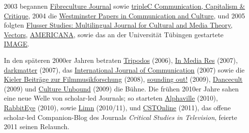 \documentclass[a4paper,
fontsize=11pt,
oneside,
numbers=noperiodatend,
parskip=half-,
bibliography=totoc,
final
]{scrartcl}
\begin{document}
2003 begannen \href{https://fibreculturejournal.org/}{Fibreculture
Journal} sowie
\href{https://www.triple-c.at/index.php/tripleC/about}{tripleC
Communication, Capitalism \& Critique}, 2004 die
\href{https://www.westminsterpapers.org/}{Westminster Papers in
Communication and Culture}, und 2005 folgten
\href{https://www.flusserstudies.net/archive}{Flusser Studies:
Multilingual Journal for Cultural and Media Theory},
\href{http://vectors.usc.edu/archive/}{Vectors},
\href{https://americanaejournal.hu/about}{AMERICANA}, sowie das an der
Universität Tübingen gestartete
\href{http://www.gib.uni-tuebingen.de/image}{IMAGE}.

In den späteren 2000er Jahren betraten
\href{http://www.tripodos.com/index.php/Facultat_Comunicacio_Blanquerna/about}{Tripodos}
(2006),
\href{https://mediacommons.org/imr/archives?sort_bef_combine_date=created+ASC}{In
Media Res} (2007),
\href{https://web.archive.org/web/20210122132539/http:/www.darkmatter101.org/site/about/}{darkmatter} (2007), das \href{https://ijoc.org/index.php/ijoc/about}{International
Journal of Communication} (2007) sowie die
\href{https://journals.qucosa.de/kbzf}{Kieler Beiträge zur
Filmmusikforschung} (2008),
\href{https://soundstudiesblog.com/}{sounding out!} (2009),
\href{https://dj.dancecult.net/index.php/dancecult/issue/view/39}{Dancecult}
(2009) und \href{https://cultureunbound.ep.liu.se/}{Culture Unbound}
(2009) die Bühne. Die frühen 2010er Jahre sahen eine neue Welle von
scholar-led Journals; so starteten
\href{http://www.alphavillejournal.com/}{Alphaville} (2010),
\href{https://www.uni-weimar.de/rabbiteye/}{RabbitEye} (2010), sowie
\href{https://limn.it/issues/prototyping-prototyping/}{Limn} (2010/11),
und
\href{https://cstonline.net/cst-online-relaunch-by-kim-akass/}{CSTOnline}
(2011), das offene scholar-led Companion-Blog des Journals
\emph{Critical Studies in Television}, feierte 2011 seinen Relaunch.
\end{document}
